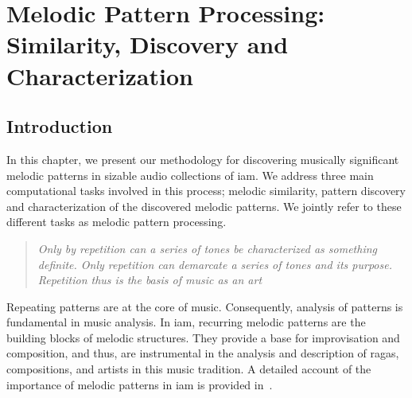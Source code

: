 
\chapter{Melodic Pattern Processing: Similarity, Discovery and Characterization}
\label{chap:melodic_pattern_processing}

\section{Introduction}
\label{sec:patterns_introduction}

In this chapter, we present our methodology for discovering musically significant melodic patterns in sizable audio collections of \gls{iam}. We address three main computational tasks involved in this process; melodic similarity, pattern discovery and characterization of the discovered melodic patterns. We jointly refer to these different tasks as melodic pattern processing.

\blockcquote[]{schenker1980harmony}{\textit{Only by repetition can a series of tones be characterized as something definite. Only repetition can demarcate a series of tones and its purpose. Repetition thus is the basis of music as an art}}

Repeating patterns are at the core of music. Consequently, analysis of patterns is fundamental in music analysis.  In \gls{iam}, recurring melodic patterns are the building blocks of melodic structures. They provide a base for improvisation and composition, and thus, are instrumental in the analysis and description of \glspl{raga}, compositions, and artists in this music tradition. A detailed account of the importance of melodic patterns in \gls{iam} is provided in~. 



